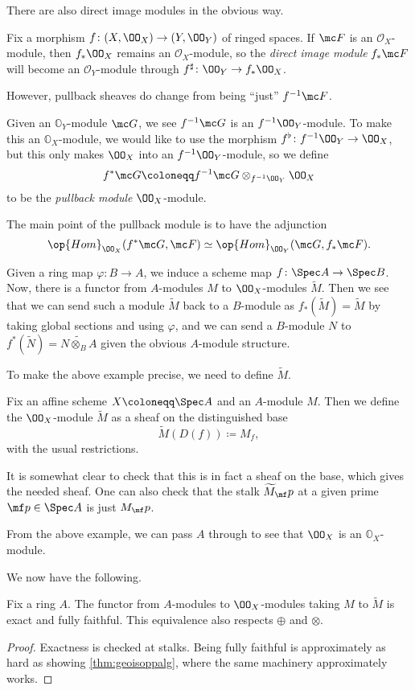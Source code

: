 \documentclass[../notes.tex]{subfiles}
\begin{document}
There are also direct image modules in the obvious way.
\begin{definition}
	Fix a morphism $f\colon(X,\OO_X)\to(Y,\OO_Y)$ of ringed spaces. If $\mc F$ is an $\mathcal O_X$-module, then $f_*\OO_X$ remains an $\mathcal O_X$-module, so the \textit{direct image module} $f_*\mc F$ will become an $\mathcal O_Y$-module through $f^\sharp\colon\OO_Y\to f_*\OO_X$.
\end{definition}
However, pullback sheaves do change from being ``just'' $f^{-1}\mc F$.
\begin{definition}
	Given an $\mathbb O_Y$-module $\mc G$, we see $f^{-1}\mc G$ is an $f^{-1}\OO_Y$-module. To make this an $\mathbb O_X$-module, we would like to use the morphism $f^\flat\colon f^{-1}\OO_Y\to\OO_X$, but this only makes $\OO_X$ into an $f^{-1}\OO_Y$-module, so we define
	\[f^*\mc G\coloneqq f^{-1}\mc G\otimes_{f^{-1}\OO_Y}\OO_X\]
	to be the \textit{pullback module} $\OO_X$-module.
\end{definition}
\begin{remark}
	The main point of the pullback module is to have the adjunction
	\[\op{Hom}_{\OO_X}(f^*\mc G,\mc F)\simeq\op{Hom}_{\OO_Y}(\mc G,f_*\mc F).\]
\end{remark}
\begin{example}
	Given a ring map $\varphi\colon B\to A$, we induce a scheme map $f\colon\Spec A\to\Spec B$. Now, there is a functor from $A$-modules $M$ to $\OO_X$-modules $\widetilde M$. Then we see that we can send such a module $\widetilde M$ back to a $B$-module as $f_*(\widetilde M)=\widetilde M$ by taking global sections and using $\varphi$, and we can send a $B$-module $N$ to $f^*(\widetilde N)=\widetilde{N\otimes_BA}$ given the obvious $A$-module structure.
\end{example}
To make the above example precise, we need to define $\widetilde M$.
\begin{definition}
	Fix an affine scheme $X\coloneqq\Spec A$ and an $A$-module $M$. Then we define the $\OO_X$-module $\widetilde M$ as a sheaf on the distinguished base
	\[\widetilde M(D(f))\coloneqq M_f,\]
	with the usual restrictions.
\end{definition}
It is somewhat clear to check that this is in fact a sheaf on the base, which gives the needed sheaf. One can also check that the stalk $\widetilde M_\mf p$ at a given prime $\mf p\in\Spec A$ is just $M_\mf p$.
\begin{example}
	From the above example, we can pass $A$ through to see that $\OO_X$ is an $\mathbb O_X$-module.
\end{example}
We now have the following.
\begin{proposition}
	Fix a ring $A$. The functor from $A$-modules to $\OO_X$-modules taking $M$ to $\widetilde M$ is exact and fully faithful. This equivalence also respects $\oplus$ and $\otimes$.
\end{proposition}
\begin{proof}
	Exactness is checked at stalks. Being fully faithful is approximately as hard as showing \autoref{thm:geoisoppalg}, where the same machinery approximately works.
\end{proof}
\end{document}
